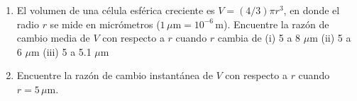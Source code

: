 \item 
\begin{enumerate}
    \item[(a)] El volumen de una célula esférica creciente es $V = (4/3)\pi r^3$, en donde el radio $r$ se mide en micrómetros ($1 \, \mu\text{m} = 10^{-6} \, \text{m}$). Encuentre la razón de cambio media de $V$ con respecto a $r$ cuando $r$ cambia de
    (i) 5 a 8 $\mu$m \quad (ii) 5 a 6 $\mu$m \quad (iii) 5 a 5.1 $\mu$m
    \item[(b)] Encuentre la razón de cambio instantánea de $V$ con respecto a $r$ cuando $r = 5 \, \mu\text{m}$.
\end{enumerate}
